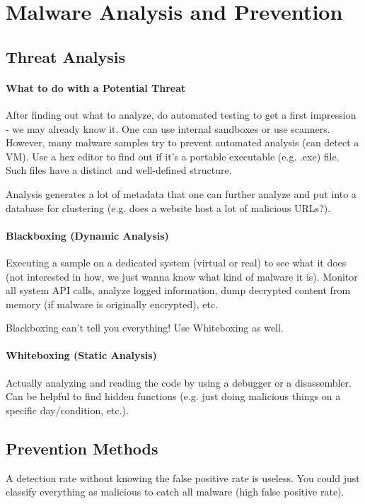 \section{Malware Analysis and Prevention}

\subsection{Threat Analysis}

\paragraph{What to do with a Potential Threat} 
After finding out what to analyze, do automated testing to get a first impression - we may already know it. One can use internal sandboxes or use scanners. However, many malware samples try to prevent automated analysis (can detect a VM). Use a hex editor to find out if it's a portable executable (e.g. .exe) file. Such files have a distinct and well-defined structure.

Analysis generates a lot of metadata that one can further analyze and put into a database for clustering (e.g. does a website host a lot of malicious URLs?).

\paragraph{Blackboxing (Dynamic Analysis)}
Executing a sample on a dedicated system (virtual or real) to see what it does (not interested in how, we just wanna know what kind of malware it is). Monitor all system API calls, analyze logged information, dump decrypted content from memory (if malware is originally encrypted), etc.

Blackboxing can't tell you everything! Use Whiteboxing as well.

\paragraph{Whiteboxing (Static Analysis)}
Actually analyzing and reading the code by using a debugger or a disassembler. Can be helpful to find hidden functions (e.g. just doing malicious things on a specific day/condition, etc.).

\subsection{Prevention Methods}
A detection rate without knowing the false positive rate is useless. You could just classify everything as malicious to catch all malware (high false positive rate).

